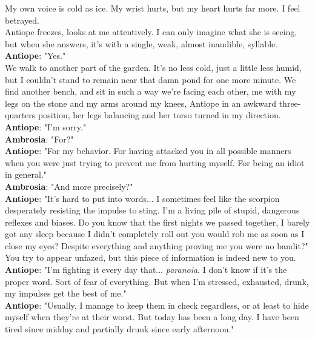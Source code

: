 \documentclass{report}
\newcommand{\speaker}[1]{
	\textbf{#1}: 
}
\begin{document}
My own voice is cold as ice. My wrist hurts, but my heart hurts far more. I feel betrayed.\\

Antiope freezes, looks at me attentively. I can only imagine what she is seeing, but when she answers, it's with a single, weak, almost inaudible, syllable.\\

\speaker{Antiope} "Yes."\\

We walk to another part of the garden. It's no less cold, just a little less humid, but I couldn't stand to remain near that damn pond for one more minute. We find another bench, and sit in such a way we're facing each other, me with my legs on the stone and my arms around my knees, Antiope in an awkward three-quarters position, her legs balancing and her torso turned in my direction.\\

\speaker{Antiope} "I'm sorry."\\

\speaker{Ambrosia} "For?"\\

\speaker{Antiope} "For my behavior. For having attacked you in all possible manners when you were just trying to prevent me from hurting myself. For being an idiot in general."\\

\speaker{Ambrosia} "And more precisely?"\\

\speaker{Antiope} "It's hard to put into words... I sometimes feel like the scorpion desperately resisting the impulse to sting. I'm a living pile of stupid, dangerous reflexes and biases. Do you know that the first nights we passed together, I barely got any sleep because I didn't completely roll out you would rob me as soon as I close my eyes? Despite everything and anything proving me you were no bandit?"\\

You try to appear unfazed, but this piece of information is indeed new to you.\\

\speaker{Antiope} "I'm fighting it every day that... \emph{paranoia}. I don't know if it's the proper word. Sort of fear of everything. But when I'm stressed, exhausted, drunk, my impulses get the best of me."\\

\speaker{Antiope} "Usually, I manage to keep them in check regardless, or at least to hide myself when they're at their worst. But today has been a long day. I have been tired since midday and partially drunk since early afternoon."\\
\end{document}
